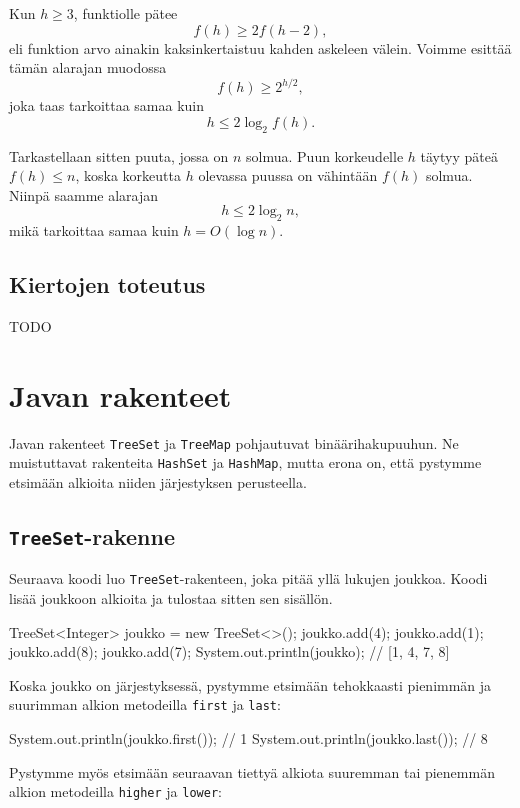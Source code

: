 Kun $h \ge 3 $, funktiolle pätee
\[f(h) \ge 2 f(h-2),\]
eli funktion arvo ainakin kaksinkertaistuu kahden askeleen välein.
Voimme esittää tämän alarajan muodossa
\[f(h) \ge 2^{h/2},\]
joka taas tarkoittaa samaa kuin
\[ h \le 2 \log_2 f(h).\]

Tarkastellaan sitten puuta, jossa on $n$ solmua.
Puun korkeudelle $h$ täytyy päteä $f(h) \le n$,
koska korkeutta $h$ olevassa puussa on vähintään $f(h)$ solmua.
Niinpä saamme alarajan
\[h \le 2 \log_2 n,\]
mikä tarkoittaa samaa kuin $h = O(\log n)$.

\subsection{Kiertojen toteutus}

TODO

\section{Javan rakenteet}

Javan rakenteet \texttt{TreeSet} ja \texttt{TreeMap}
pohjautuvat binäärihakupuuhun.
Ne muistuttavat rakenteita \texttt{HashSet} ja \texttt{HashMap},
mutta erona on, että pystymme etsimään
alkioita niiden järjestyksen perusteella.

\subsection{\texttt{TreeSet}-rakenne}

Seuraava koodi luo \texttt{TreeSet}-rakenteen,
joka pitää yllä lukujen joukkoa.
Koodi lisää joukkoon alkioita ja tulostaa sitten sen sisällön.

\begin{code}
TreeSet<Integer> joukko = new TreeSet<>();
joukko.add(4);
joukko.add(1);
joukko.add(8);
joukko.add(7);
System.out.println(joukko); // [1, 4, 7, 8]
\end{code}

Koska joukko on järjestyksessä, pystymme etsimään tehokkaasti
pienim\-män ja suurimman alkion metodeilla \texttt{first} ja \texttt{last}:

\begin{code}
System.out.println(joukko.first()); // 1
System.out.println(joukko.last()); // 8
\end{code}

Pystymme myös etsimään seuraavan tiettyä alkiota
suuremman tai pienemmän alkion metodeilla \texttt{higher} ja \texttt{lower}:

